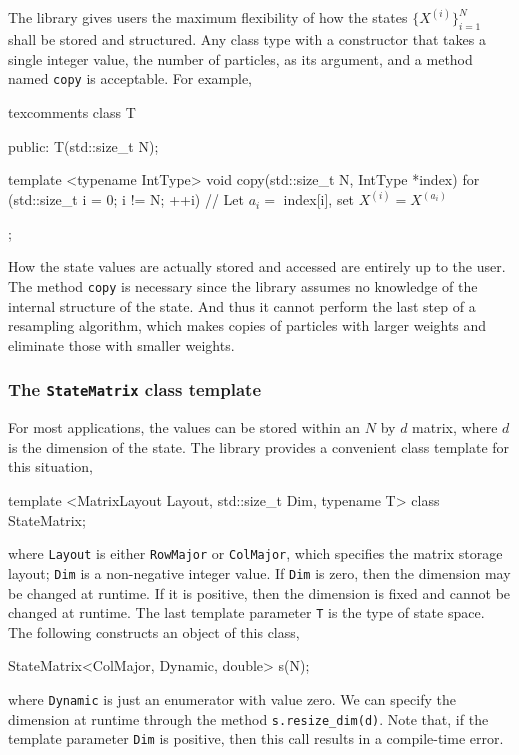 The library gives users the maximum flexibility of how the states
$\{X^{(i)}\}_{i=1}^N$ shall be stored and structured. Any class type with a
constructor that takes a single integer value, the number of particles, as its
argument, and a method named \verb|copy| is acceptable. For example,
\begin{cppcode*}{texcomments}
  class T
  {
      public:
      T(std::size_t N);

      template <typename IntType>
      void copy(std::size_t N, IntType *index)
      {
          for (std::size_t i = 0; i != N; ++i) {
              // Let $a_i =$ index[i], set $X^{(i)} = X^{(a_i)}$
          }
      }
  };
\end{cppcode*}
How the state values are actually stored and accessed are entirely up to the
user. The method \verb|copy| is necessary since the library assumes no
knowledge of the internal structure of the state. And thus it cannot perform
the last step of a resampling algorithm, which makes copies of particles with
larger weights and eliminate those with smaller weights.

\subsubsection{The \texttt{StateMatrix} class template}

For most applications, the values can be stored within an $N$ by $d$ matrix,
where $d$ is the dimension of the state. The library provides a convenient
class template for this situation,
\begin{cppcode}
  template <MatrixLayout Layout, std::size_t Dim, typename T>
  class StateMatrix;
\end{cppcode}
where \verb|Layout| is either \verb|RowMajor| or \verb|ColMajor|, which
specifies the matrix storage layout; \verb|Dim| is a non-negative integer
value. If \verb|Dim| is zero, then the dimension may be changed at runtime. If
it is positive, then the dimension is fixed and cannot be changed at runtime.
The last template parameter \verb|T| is the \cpp type of state space. The
following constructs an object of this class,
\begin{cppcode}
  StateMatrix<ColMajor, Dynamic, double> s(N);
\end{cppcode}
where \verb|Dynamic| is just an enumerator with value zero. We can specify the
dimension at runtime through the method \verb|s.resize_dim(d)|. Note that, if
the template parameter \verb|Dim| is positive, then this call results in a
compile-time error.


